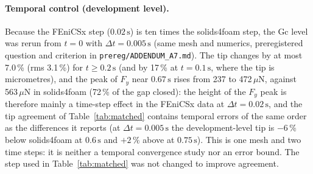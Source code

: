 \paragraph{Temporal control (development level).} Because the FEniCSx step ($0.02\,\mathrm{s}$) is ten times the solids4foam step, the Gc level was rerun from $t=0$ with $\Delta t=0.005\,\mathrm{s}$ (same mesh and numerics, preregistered question and criterion in \texttt{prereg/ADDENDUM\_A7.md}). The tip changes by at most 7.0\,\% (rms 3.1\,\%) for $t\ge0.2\,\mathrm{s}$ (and by 17\,\% at $t=0.1\,\mathrm{s}$, where the tip is micrometres), and the peak of $F_y$ near $0.67\,\mathrm{s}$ rises from 237 to 472\,$\mu$N, against 563\,$\mu$N in solids4foam (72\,\% of the gap closed): the height of the $F_y$ peak is therefore mainly a time-step effect in the FEniCSx data at $\Delta t=0.02\,\mathrm{s}$, and the tip agreement of Table~\ref{tab:matched} contains temporal errors of the same order as the differences it reports (at $\Delta t=0.005\,\mathrm{s}$ the development-level tip is $-6\,\%$ below solids4foam at $0.6\,\mathrm{s}$ and $+2\,\%$ above at $0.75\,\mathrm{s}$). This is one mesh and two time steps: it is neither a temporal convergence study nor an error bound. The step used in Table~\ref{tab:matched} was not changed to improve agreement.\par\begin{table}[htbp]\centering\caption{Temporal control on the development level Gc (not an accepted level) against solids4foam (ours).}\label{tab:temporal}\scriptsize\setlength{\tabcolsep}{3pt}\temporaltable\end{table}
